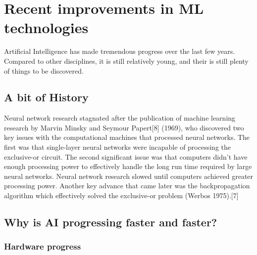 \documentclass[12pt]{article}
\begin{document}
\pagebreak


\section{Recent improvements in ML technologies}

Artificial Intelligence has made tremendous progress over the last few years.
Compared to other disciplines, it is still relatively young, and their is still
plenty of things to be discovered.

\subsection{A bit of History}



Neural network research stagnated after the publication of machine learning
research by Marvin Minsky and Seymour Papert[8] (1969), who discovered two key
issues with the computational machines that processed neural networks. The first
was that single-layer neural networks were incapable of processing the
exclusive-or circuit. The second significant issue was that computers didn't
have enough processing power to effectively handle the long run time required
by large neural networks. Neural network research slowed until computers
achieved greater processing power. Another key advance that came later was
the backpropagation algorithm which effectively solved the exclusive-or problem
(Werbos 1975).[7]

%

\subsection{Why is AI progressing faster and faster?}



\subsubsection{Hardware progress}
\end{document}
